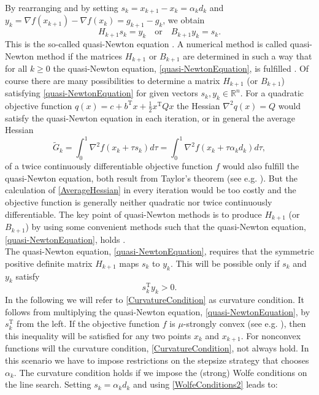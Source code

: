 By rearranging and by setting $s_k = x_{k+1} - x_k = \alpha_k d_k$ and $y_k = \nabla f(x_{k+1}) - \nabla f(x_k) = g_{k+1} - g_k$, we obtain
\begin{equation}\label{quasi-NewtonEquation}
    H_{k+1} s_k = y_k \quad \text{or} \quad B_{k+1} y_k = s_k.
\end{equation}
This is the so-called quasi-Newton equation \cite[p.~136-137]{NocedalWright:2006}. A numerical method is called quasi-Newton method if the matrices $H_{k+1}$ or $B_{k+1}$ are determined in such a way that for all $k \geq 0$ the quasi-Newton equation, \cref{quasi-NewtonEquation}, is fulfilled \cite[p.~65]{UlbrichUlbrich:2012}. Of course there are many possibilities to determine a matrix $H_{k+1}$ (or $B_{k+1}$) satisfying \cref{quasi-NewtonEquation} for given vectors $s_k, y_k \in \mathbb{R}^n$. For a quadratic objective function $q(x) = c + b^{\mathrm{T}} x + \frac{1}{2} x^{\mathrm{T}} Q x$ the Hessian $\nabla^2 q(x) = Q$ would satisfy the quasi-Newton equation in each iteration, or in general the average Hessian
\begin{equation}\label{AverageHessian}
    \tilde{G}_k = \int_{0}^{1} \nabla^2 f(x_k + \tau s_k) d\tau = \int_{0}^{1} \nabla^2 f(x_k + \tau \alpha_k d_k) d\tau,
\end{equation}
of a twice continuously differentiable objective function $f$ would also fulfill the quasi-Newton equation, both result from Taylor's theorem (see e.g. \cite[Theorem~2.1]{NocedalWright:2006}). But the calculation of \cref{AverageHessian} in every iteration would be too costly and the objective function is generally neither quadratic nor twice continuously differentiable. The key point of quasi-Newton methods is to produce $H_{k+1}$ (or $B_{k+1}$) by using some convenient methods such that the quasi-Newton equation, \cref{quasi-NewtonEquation}, holds \cite[p.~205]{SunYuan:2006}. \\
The quasi-Newton equation, \cref{quasi-NewtonEquation}, requires that the symmetric positive definite matrix $H_{k+1}$ maps $s_k$ to $y_k$. This will be possible only if $s_k$ and $y_k$ satisfy
\begin{equation}\label{CurvatureCondition}
    s^{\mathrm{T}}_k y_k > 0.
\end{equation}
In the following we will refer to \cref{CurvatureCondition} as curvature condition. It follows from multiplying the quasi-Newton equation, \cref{quasi-NewtonEquation}, by $s^{\mathrm{T}}_k$ from the left. If the objective function $f$ is $\mu$-strongly convex (see e.g. \cite[p.~72]{BertsekasNedicOzdaglar:2003}), then this inequality will be satisfied for any two points $x_k$ and $x_{k+1}$. For nonconvex functions will the curvature condition, \cref{CurvatureCondition}, not always hold. In this scenario we have to impose restrictions on the stepsize strategy that chooses $\alpha_k$. The curvature condition holds if we impose the (strong) Wolfe conditions on the line search. Setting $s_k = \alpha_k d_k$ and using \cref{WolfeConditions2} leads to: 

